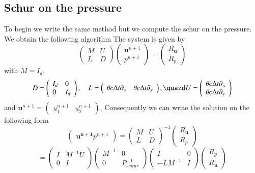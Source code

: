 \documentclass[a4paper,twoside,french,english,11pt]{article}
\newcommand{\dy}{\partial_y}
\newcommand{\dx}{\partial_x}
\newcommand{\ds}{\displaystyle}
\begin{document}
\subsection{Schur on the pressure}
To begin we write the same method but we compute the schur on the pressure. We obtain the following algorithm
The system is given by 
$$
\left(\begin{array}{ll} 
M  & U \\
 L & D\end{array}\right)\left(\begin{array}{l} 
 \mathbf{u}^{n+1}\\
 p^{n+1} \end{array}\right)=\left(\begin{array}{l} 
 R_\mathbf{u}\\
 R_p \end{array}\right)
 $$
with $M=I_d$,
 $$
 D=\left(\begin{array}{ll} 
I_d  & 0 \\
 0 & I_d\end{array}\right),\quad
  L=\left(\begin{array}{ll} 
\ds\theta c\Delta t  \dx  & \ds\theta c\Delta t  \dy \end{array}\right),\quazd
  U=\left(\begin{array}{l} 
\ds  \theta c \Delta t  \dx  \\
\ds \theta c \Delta t\dy \end{array}\right)
 $$
 and $\ds \mathbf{u}^{n+1}=\left(\begin{array}{ll} 
u_1^{n+1}  & u_2^{n+1} \end{array}\right)$. 
Consequently we can write the solution on the following form
$$
\left(\begin{array}{l} 
 \mathbf{u^{n+1}}
 p^{n+1} \end{array}\right) =\left(\begin{array}{ll}
M & U  \\
L & D\end{array}\right)^{-1}\left(\begin{array}{l} 
 R_\mathbf{u}\\
 R_p \end{array}\right)
$$
$$
=\left(\begin{array}{ll}
I & M^{-1} U  \\
0 & I\end{array}\right)\left(\begin{array}{ll}
M^{-1} & 0  \\
0 & P_{schur}^{-1}\end{array}\right)\left(\begin{array}{ll}
I & 0  \\
-LM^{-1} & I\end{array}\right)\left(\begin{array}{l} 
R_p \\
 R_\mathbf{u}\end{array}\right)
 $$
\end{document}
